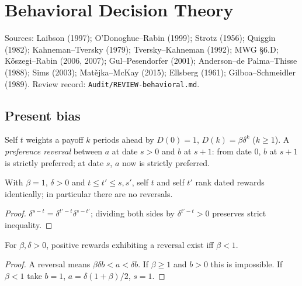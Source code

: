\chapter{Behavioral Decision Theory}
\label{chap:behavioral}

Sources: Laibson (1997); O'Donoghue--Rabin (1999); Strotz (1956); Quiggin (1982); Kahneman--Tversky (1979);
Tversky--Kahneman (1992); MWG \S6.D; K\H{o}szegi--Rabin (2006, 2007); Gul--Pesendorfer (2001);
Anderson--de Palma--Thisse (1988); Sims (2003); Mat\v{e}jka--McKay (2015); Ellsberg (1961);
Gilboa--Schmeidler (1989). Review record: \texttt{Audit/REVIEW-behavioral.md}.

\section{Present bias}
\label{sec:beh-present-bias}

\begin{definition}
\label{def:beh-discount}
\leanok
Self $t$ weights a payoff $k$ periods ahead by $D(0)=1$, $D(k)=\beta\delta^k$ ($k\ge1$). A \emph{preference
reversal} between $a$ at date $s>0$ and $b$ at $s+1$: from date $0$, $b$ at $s+1$ is strictly preferred; at date
$s$, $a$ now is strictly preferred.
\end{definition}

\begin{theorem}
\label{thm:beh-exp-consistent}
\leanok
{}
With $\beta=1$, $\delta>0$ and $t\le t'\le s,s'$, self $t$ and self $t'$ rank dated rewards identically; in
particular there are no reversals.
\end{theorem}
\begin{proof}
\leanok
$\delta^{s-t}=\delta^{t'-t}\delta^{s-t'}$; dividing both sides by $\delta^{t'-t}>0$ preserves strict inequality.
\end{proof}

\begin{theorem}
\label{thm:beh-reversal-iff}
\leanok
{}
For $\beta,\delta>0$, positive rewards exhibiting a reversal exist iff $\beta<1$.
\end{theorem}
\begin{proof}
\leanok
A reversal means $\beta\delta b<a<\delta b$. If $\beta\ge1$ and $b>0$ this is impossible. If $\beta<1$ take $b=1$,
$a=\delta(1+\beta)/2$, $s=1$.
\end{proof}

